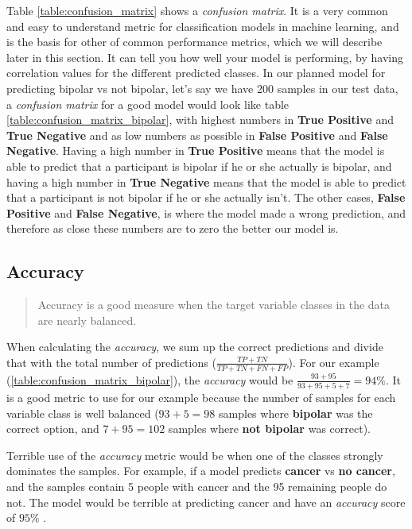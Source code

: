 Table \ref{table:confusion_matrix} shows a \textit{confusion matrix}. It is a very common and easy to understand metric for classification models in machine 
learning, and is the basis for other of common performance metrics, which we will describe later in this section. It can tell you how well your model is performing, 
by having correlation values for the different predicted classes. In our planned model for 
predicting bipolar vs not bipolar, let's say we have 200 samples in our test data, a \textit{confusion matrix} for a good model would look like 
table \ref{table:confusion_matrix_bipolar}, with highest numbers in \textbf{True Positive} and \textbf{True Negative} and as low numbers as possible in 
\textbf{False Positive} and \textbf{False Negative}. Having a high number in \textbf{True Positive} means that the model is able to predict that a 
participant is bipolar if he or she actually is bipolar, and having a high number in \textbf{True Negative} means that the model is able to predict 
that a participant is not bipolar if he or she actually isn't. The other cases, \textbf{False Positive} and \textbf{False Negative}, is where the model
made a wrong prediction, and therefore as close these numbers are to zero the better our model is.

\subsection{Accuracy}

\blockquote[\cite{ml_metrics}]{Accuracy is a good measure when the target variable classes in the data are nearly balanced.}

When calculating the \textit{accuracy}, we sum up the correct predictions and divide that with the total number of predictions 
($ \frac{TP + TN}{TP + TN + FN + FP} $).
For our example (\ref{table:confusion_matrix_bipolar}), the \textit{accuracy} would be 
$ \frac{93 + 95}{93 + 95 + 5 + 7} = 94\% $. 
It is a good metric to use for our example because the number of samples for each variable class is well balanced 
($ 93+5=98 $ samples where \textbf{bipolar} was the correct option, and $ 7+95=102 $ samples where \textbf{not bipolar} was correct).

Terrible use of the \textit{accuracy} metric would be when one of the classes strongly dominates the samples. 
For example, if a model predicts \textbf{cancer} vs \textbf{no cancer}, and the samples contain 5 people with cancer and 
the 95 remaining people do not. The model would be terrible at predicting cancer and have an \textit{accuracy} score of $ 95\% $ \cite{ml_metrics}.

